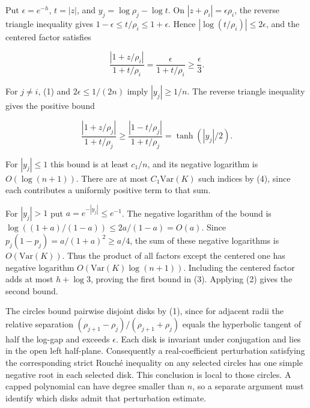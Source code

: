 \documentclass[11pt]{article}
\begin{document}
Put $\epsilon=e^{-h}$, $t=|z|$, and $y_j=\log\rho_j-\log t$. On $|z+\rho_i|=\epsilon\rho_i$, the reverse triangle inequality gives $1-\epsilon\le t/\rho_i\le1+\epsilon$. Hence $|\log(t/\rho_i)|\le2\epsilon$, and the centered factor satisfies

\[
\frac{|1+z/\rho_i|}{1+t/\rho_i}=\frac{\epsilon}{1+t/\rho_i}\ge\frac{\epsilon}{3}.
\]

For $j\ne i$, (1) and $2\epsilon\le1/(2n)$ imply $|y_j|\ge 1/n$. The reverse triangle inequality gives the positive bound

\[
\frac{|1+z/\rho_j|}{1+t/\rho_j}
\ge\frac{|1-t/\rho_j|}{1+t/\rho_j}
=\tanh(|y_j|/2).
\]

For $|y_j|\le1$ this bound is at least $c_1/n$, and its negative logarithm is $O(\log(n+1))$. There are at most $C_1\mathrm{Var}(K)$ such indices by (4), since each contributes a uniformly positive term to that sum.

For $|y_j|>1$ put $a=e^{-|y_j|}\le e^{-1}$. The negative logarithm of the bound is $\log((1+a)/(1-a))\le 2a/(1-a)=O(a)$. Since $p_j(1-p_j)=a/(1+a)^2\ge a/4$, the sum of these negative logarithms is $O(\mathrm{Var}(K))$. Thus the product of all factors except the centered one has negative logarithm $O(\mathrm{Var}(K)\log(n+1))$. Including the centered factor adds at most $h+\log3$, proving the first bound in (3). Applying (2) gives the second bound.

The circles bound pairwise disjoint disks by (1), since for adjacent radii the relative separation $(\rho_{j+1}-\rho_j)/(\rho_{j+1}+\rho_j)$ equals the hyperbolic tangent of half the log-gap and exceeds $\epsilon$. Each disk is invariant under conjugation and lies in the open left half-plane. Consequently a real-coefficient perturbation satisfying the corresponding strict Rouch\'e inequality on any selected circles has one simple negative root in each selected disk. This conclusion is local to those circles. A capped polynomial can have degree smaller than $n$, so a separate argument must identify which disks admit that perturbation estimate.
\end{document}
